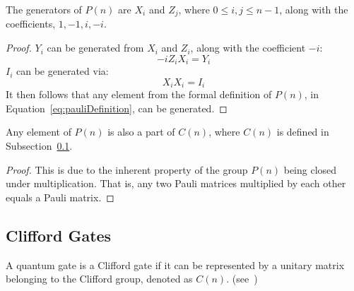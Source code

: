 \begin{theorem}
\label{theorem:pauliGenerators}
The generators of $P(n)$ are $X_i$ and $Z_j$, where $0 \leq i, j \leq n-1$, along with the coefficients, $1,-1,i,-i$.
\end{theorem}
\begin{proof}
$Y_i$ can be generated from $X_i$ and $Z_i$, along with the coefficient $-i$:
$$-iZ_iX_i = Y_i$$
$I_i$ can be generated via:
$$X_iX_i = I_i$$
It then follows that any element from the formal definition of $P(n)$, in Equation~\eqref{eq:pauliDefinition}, can be generated.
\end{proof}

\begin{theorem}
\label{theorem:paulisAreCliffords}
Any element of $P(n)$ is also a part of $C(n)$, where $C(n)$ is defined in Subsection~\ref{subsubsection:Clifford}.
\end{theorem}
\begin{proof}
This is due to the inherent property of the group $P(n)$ being closed under multiplication. That is, any two Pauli matrices multiplied by each other equals a Pauli matrix.
\end{proof}

\subsection{Clifford Gates}
\label{subsubsection:Clifford}
A quantum gate is a Clifford gate if it can be represented by a unitary matrix belonging to the Clifford group, denoted as $C(n)$. (see~\cite{gottesman1997stabilizer})

